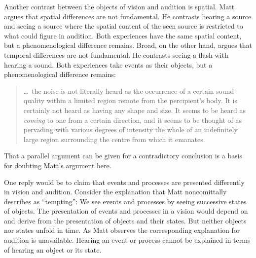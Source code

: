 \documentclass[12pt]{article}
\begin{document}
Another contrast between the objects of vision and audition is spatial. Matt argues that spatial differences are not fundamental. He contrasts hearing a source and seeing a source where the spatial content of the seen source is restricted to what could figure in audition. Both experiences have the same spatial content, but a phenomenological difference remains. Broad, on the other hand, argues that temporal differences are not fundamental. He contrasts seeing a flash with hearing a sound. Both experiences take events as their objects, but a phenomenological difference remains:
\begin{quote}
	\ldots\ the noise is not literally heard as the occurrence of a certain sound-quality within a limited region remote from the percipient's body. It is certainly not heard as having any shape and size. It seems to be heard as \emph{coming} to one from a certain direction, and it seems to be thought of as pervading with various degrees of intensity the whole of an indefinitely large region surrounding the centre from which it emanates. \citep[32]{Broad:1965dq}
\end{quote}
That a parallel argument can be given for a contradictory conclusion is a basis for doubting Matt's argument here.

One reply would be to claim that events and processes are presented differently in vision and audition. Consider the explanation that Matt noncomittally describes as ``tempting'': We see events and processes by seeing successive states of objects. The presentation of events and processes in a vision would depend on and derive from the presentation of objects and their states. But neither objects nor states unfold in time. As Matt observes the corresponding explanation for audition is unavailable. Hearing an event or process cannot be explained in terms of hearing an object or its state. 
\end{document}
